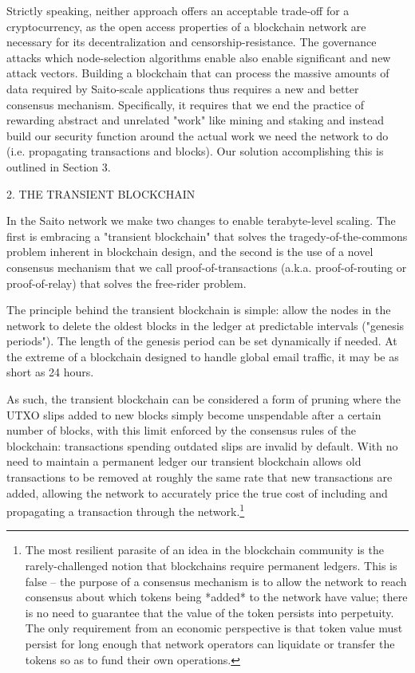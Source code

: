 \documentclass[11.5pt, oneside]{article}   	%
\begin{document}
\begin{multicols}{2}
Strictly speaking, neither approach offers an acceptable trade-off for a cryptocurrency, as the open access properties of a blockchain network are necessary for its decentralization and censorship-resistance. The governance attacks which node-selection algorithms enable also enable significant and new attack vectors. Building a blockchain that can process the massive amounts of data required by Saito-scale applications thus requires a new and better consensus mechanism. Specifically, it requires that we end the practice of rewarding abstract and unrelated "work" like mining and staking and instead build our security function around the actual work we need the network to do (i.e. propagating transactions and blocks). Our solution accomplishing this is outlined in Section 3.

2. THE TRANSIENT BLOCKCHAIN

In the Saito network we make two changes to enable terabyte-level scaling. The first is embracing a "transient blockchain" that solves the tragedy-of-the-commons problem inherent in blockchain design, and the second is the use of a novel consensus mechanism that we call proof-of-transactions (a.k.a. proof-of-routing or proof-of-relay) that solves the free-rider problem. 

The principle behind the transient blockchain is simple: allow the nodes in the network to delete the oldest blocks in the ledger at predictable intervals ("genesis periods"). The length of the genesis period can be set dynamically if needed. At the extreme of a blockchain designed to handle global email traffic, it may be as short as 24 hours.

As such, the transient blockchain can be considered a form of pruning where the UTXO slips added to new blocks simply become unspendable after a certain number of blocks, with this limit enforced by the consensus rules of the blockchain: transactions spending outdated slips are invalid by default. With no need to maintain a permanent ledger our transient blockchain allows old transactions to be removed at roughly the same rate that new transactions are added, allowing the network to accurately price the true cost of including and propagating a transaction through the network.\footnote[1]{The most resilient parasite of an idea in the blockchain community is the rarely-challenged notion that blockchains require permanent ledgers. This is false -- the purpose of a consensus mechanism is to allow the network to reach consensus about which tokens being *added* to the network have value; there is no need to guarantee that the value of the token persists into perpetuity. The only requirement from an economic perspective is that token value must persist for long enough that network operators can liquidate or transfer the tokens so as to fund their own operations.}


\end{multicols}
\end{document}
